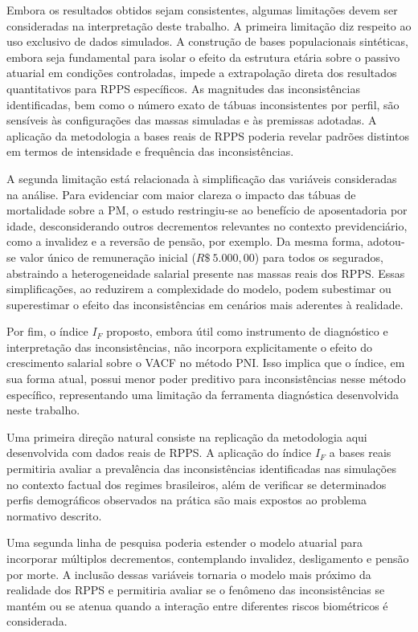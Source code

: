 Embora os resultados obtidos sejam consistentes, algumas limitações devem ser consideradas na interpretação deste trabalho. A primeira limitação diz respeito ao uso exclusivo de dados simulados. A construção de bases populacionais sintéticas, embora seja fundamental para isolar o efeito da estrutura etária sobre o passivo atuarial em condições controladas, impede a extrapolação direta dos resultados quantitativos para RPPS específicos. As magnitudes das inconsistências identificadas, bem como o número exato de tábuas inconsistentes por perfil, são sensíveis às configurações das massas simuladas e às premissas adotadas. A aplicação da metodologia a bases reais de RPPS poderia revelar padrões distintos em termos de intensidade e frequência das inconsistências.

A segunda limitação está relacionada à simplificação das variáveis consideradas na análise. Para evidenciar com maior clareza o impacto das tábuas de mortalidade sobre a PM, o estudo restringiu-se ao benefício de aposentadoria por idade, desconsiderando outros decrementos relevantes no contexto previdenciário, como a invalidez e a reversão de pensão, por exemplo. Da mesma forma, adotou-se valor único de remuneração inicial ($R\$~5.000,00$) para todos os segurados, abstraindo a heterogeneidade salarial presente nas massas reais dos RPPS. Essas simplificações, ao reduzirem a complexidade do modelo, podem subestimar ou superestimar o efeito das inconsistências em cenários mais aderentes à realidade.

Por fim, o índice $I_F$ proposto, embora útil como instrumento de diagnóstico e interpretação das inconsistências, não incorpora explicitamente o efeito do crescimento salarial sobre o VACF no método PNI. Isso implica que o índice, em sua forma atual, possui menor poder preditivo para inconsistências nesse método específico, representando uma limitação da ferramenta diagnóstica desenvolvida neste trabalho.

Uma primeira direção natural consiste na replicação da metodologia aqui desenvolvida com dados reais de RPPS. A aplicação do índice $I_F$ a bases reais permitiria avaliar a prevalência das inconsistências identificadas nas simulações no contexto factual dos regimes brasileiros, além de verificar se determinados perfis demográficos observados na prática são mais expostos ao problema normativo descrito.

Uma segunda linha de pesquisa poderia estender o modelo atuarial para incorporar múltiplos decrementos, contemplando invalidez, desligamento e pensão por morte. A inclusão dessas variáveis tornaria o modelo mais próximo da realidade dos RPPS e permitiria avaliar se o fenômeno das inconsistências se mantém ou se atenua quando a interação entre diferentes riscos biométricos é considerada.

